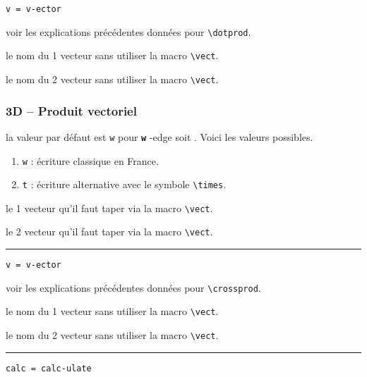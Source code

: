 \documentclass[12pt,a4paper]{article}
\makeatletter
\theoremstyle{definition}
\newcommand\env[1]{\texttt{#1}}
\newcommand\macro[1]{\env{\textbackslash{}#1}}
\newcommand\separation{
    \medskip
    \hfill\rule{0.5\textwidth}{0.75pt}\hfill
    \medskip
}
\newcommand\whyprefix[2]{%
    \textbf{\prefix{#1}}-#2%
}
\newcommand\mwhyprefix[2]{%
    \texttt{#1 = #1-#2}%
}
\newcommand\prefix[1]{%
    \texttt{#1}%
}
\newcommand\inenglish{\@ifstar{\@inenglish@star}{\@inenglish@no@star}}
\newcommand\@inenglish@star[1]{%
    \emph{\og #1 \fg}%
}
\newcommand\@inenglish@no@star[1]{%
    \@inenglish@star{#1} en anglais%
}
\makeatother
\begin{document}
 \hfill \mwhyprefix{v}{ector}

\IDoption{} voir les explications précédentes données pour \macro{dotprod}.

 le nom du 1\ier{} vecteur sans utiliser la macro \macro{vect}.

 le nom du 2\ieme{} vecteur sans utiliser la macro \macro{vect}.


\subsubsection{3D -- Produit vectoriel}




\IDoption{} la valeur par défaut est \verb+w+ pour \whyprefix{w}{edge} soit \inenglish{coin}. Voici les valeurs possibles.

\begin{enumerate}
	\item \verb+w+ : écriture classique en France.

	\item \verb+t+ : écriture alternative avec le symbole \macro{times}.

\end{enumerate}

 le 1\ier{} vecteur qu'il faut taper via la macro \macro{vect}.

 le 2\ieme{} vecteur qu'il faut taper via la macro \macro{vect}.


\separation


 \hfill \mwhyprefix{v}{ector}

\IDoption{} voir les explications précédentes données pour \macro{crossprod}.

 le nom du 1\ier{} vecteur sans utiliser la macro \macro{vect}.

 le nom du 2\ieme{} vecteur sans utiliser la macro \macro{vect}.


\separation


  \hfill \mwhyprefix{calc}{ulate}
\end{document}
